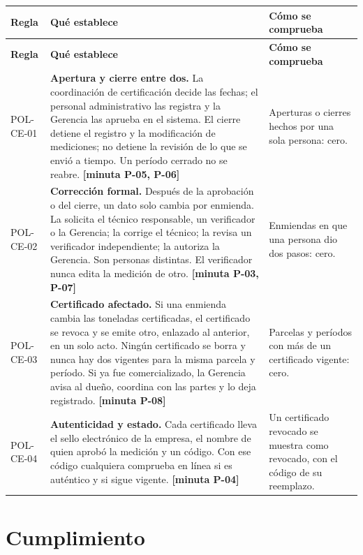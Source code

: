\documentclass[11pt,letterpaper]{article}
\newcommand{\cab}[1]{\textbf{\rmfamily #1}}
\newcommand{\resp}[1]{\textrm{\footnotesize\bfseries [minuta #1]}}
\begin{document}
{\small
\renewcommand{\arraystretch}{1.14}
\begin{longtable}{@{}L{1.7cm} L{9.2cm} L{4.8cm}@{}}
\toprule
\cab{Regla} & \cab{Qué establece} & \cab{Cómo se comprueba} \\
\midrule
\endfirsthead
\toprule
\cab{Regla} & \cab{Qué establece} & \cab{Cómo se comprueba} \\
\midrule
\endhead
\bottomrule
\endfoot
POL-CE-01 & \textbf{Apertura y cierre entre dos.} La coordinación de certificación decide las fechas; el personal administrativo las registra y la Gerencia las aprueba en el sistema. El cierre detiene el registro y la modificación de mediciones; no detiene la revisión de lo que se envió a tiempo. Un período cerrado no se reabre. \resp{P-05, P-06} & Aperturas o cierres hechos por una sola persona: cero. \\
POL-CE-02 & \textbf{Corrección formal.} Después de la aprobación o del cierre, un dato solo cambia por enmienda. La solicita el técnico responsable, un verificador o la Gerencia; la corrige el técnico; la revisa un verificador independiente; la autoriza la Gerencia. Son personas distintas. El verificador nunca edita la medición de otro. \resp{P-03, P-07} & Enmiendas en que una persona dio dos pasos: cero. \\
POL-CE-03 & \textbf{Certificado afectado.} Si una enmienda cambia las toneladas certificadas, el certificado se revoca y se emite otro, enlazado al anterior, en un solo acto. Ningún certificado se borra y nunca hay dos vigentes para la misma parcela y período. Si ya fue comercializado, la Gerencia avisa al dueño, coordina con las partes y lo deja registrado. \resp{P-08} & Parcelas y períodos con más de un certificado vigente: cero. \\
POL-CE-04 & \textbf{Autenticidad y estado.} Cada certificado lleva el sello electrónico de la empresa, el nombre de quien aprobó la medición y un código. Con ese código cualquiera comprueba en línea si es auténtico y si sigue vigente. \resp{P-04} & Un certificado revocado se muestra como revocado, con el código de su reemplazo. \\
\end{longtable}
}

\section{Cumplimiento}
\label{sec:cumplimiento}
\end{document}
